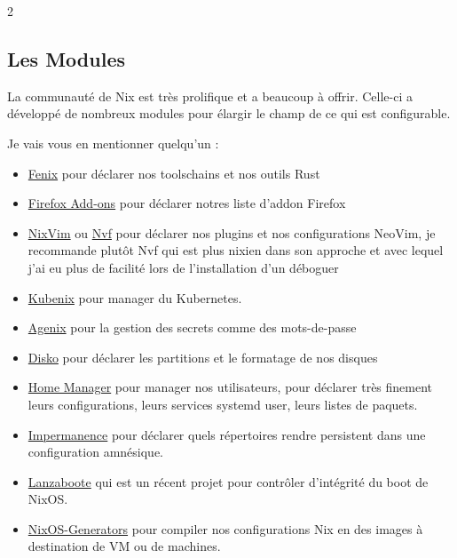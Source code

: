 \documentclass[a4paper,11pt]{article}
\begin{document}
\begin{blogmain}
\begin{multicols}{2}
\subsection{Les Modules}
La communauté de Nix est très prolifique et a beaucoup à offrir.
Celle-ci a développé de nombreux modules pour élargir le champ de ce qui est configurable.

Je vais vous en mentionner quelqu'un :
\begin{itemize}
  \item \href{https://github.com/nix-community/fenix}{Fenix} pour déclarer nos toolschains et nos outils Rust
  \item \href{https://gitlab.com/rycee/nur-expressions}{Firefox Add-ons} pour déclarer notres liste d'addon Firefox
  \item \href{https://github.com/nix-community/nixvim}{NixVim} ou \href{https://github.com/NotAShelf/nvf}{Nvf} pour déclarer nos plugins et nos configurations NeoVim, je recommande plutôt Nvf qui est plus nixien dans son approche et avec lequel j'ai eu plus de facilité lors de l'installation d'un déboguer
  \item \href{https://github.com/hall/kubenix}{Kubenix} pour manager du Kubernetes.
  \item \href{https://github.com/ryantm/agenix}{Agenix} pour la gestion des secrets comme des mots-de-passe
  \item \href{https://github.com/nix-community/disko}{Disko} pour déclarer les partitions et le formatage de nos disques
  \item \href{https://github.com/nix-community/home-manager}{Home Manager} pour manager nos utilisateurs, pour déclarer très finement leurs configurations, leurs services systemd user, leurs listes de paquets.
  \item \href{https://github.com/nix-community/impermanence}{Impermanence} pour déclarer quels répertoires rendre persistent dans une configuration amnésique.
  \item \href{https://github.com/nix-community/lanzaboote}{Lanzaboote} qui est un récent projet pour contrôler d'intégrité du boot de NixOS.
  \item \href{https://github.com/nix-community/nixos-generators}{NixOS-Generators} pour compiler nos configurations Nix en des images à destination de VM ou de machines.
\end{itemize}


\end{multicols}
\end{blogmain}
\end{document}
